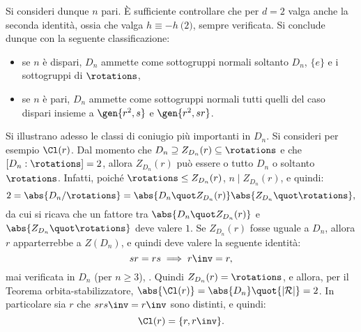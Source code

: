 \documentclass[12pt]{scrartcl}
\begin{document}
	
	Si consideri dunque $n$ pari. È sufficiente controllare che per $d = 2$ valga
	anche la seconda identità, ossia che valga $h \equiv -h \pod 2$, sempre verificata.
	Si conclude dunque con la seguente classificazione:
	
	\begin{itemize}
		\item se $n$ è dispari, $D_n$ ammette come sottogruppi normali soltanto
		$D_n$, $\{ e \}$ e i sottogruppi di $\rotations$,
		\item se $n$ è pari, $D_n$ ammette come sottogruppi normali tutti quelli
			del caso dispari insieme a $\gen{r^2, s}$ e $\gen{r^2, s r}$.
	\end{itemize}
	
	
	Si illustrano adesso le classi di coniugio più importanti in $D_n$. Si consideri
	per esempio $\Cl(r)$. Dal momento che $D_n \supseteq Z_{D_n}(r) \subseteq \rotations$
	e che $[D_n : \rotations] = 2$, allora $Z_{D_n}(r)$ può essere o tutto $D_n$ o
	soltanto $\rotations$. Infatti, poiché $\rotations \leq Z_{D_n}(r)$,
	$n \mid Z_{D_n}(r)$, e quindi:
	\[ 2 = \abs{D_n/\rotations} = \abs{D_n \quot Z_{D_n}(r)} \abs{Z_{D_n} \quot \rotations}, \]
	da cui si ricava che un fattore tra $\abs{D_n \quot Z_{D_n}(r)}$ e
	$\abs{Z_{D_n} \quot \rotations}$ deve valere $1$. Se $Z_{D_n}(r)$ fosse uguale a
	$D_n$, allora $r$ apparterrebbe a $Z(D_n)$, e quindi deve valere la seguente identità:
	\[ sr = rs \implies r\inv = r, \]
	mai verificata in $D_n$ (per $n \geq 3$), \Lightning. Quindi $Z_{D_n}(r) = \rotations$,
	e allora, per il Teorema orbita-stabilizzatore, $\abs{\Cl(r)} = \abs{D_n} \quot {\left\lvert \mathcal{R} \right\rvert} = 2$. In particolare sia $r$ che $s r s\inv = r\inv$ sono distinti,
	e quindi:
	\[ \Cl(r) = \{r, r\inv\}. \] %
\end{document}
